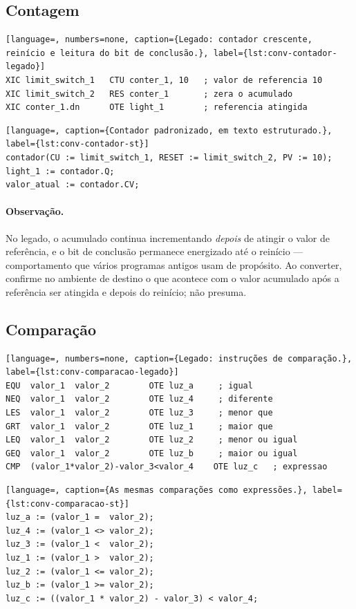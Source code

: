 \subsection{Contagem}

\begin{lstlisting}[language=, numbers=none, caption={Legado: contador crescente, reinício e leitura do bit de conclusão.}, label={lst:conv-contador-legado}]
XIC limit_switch_1   CTU conter_1, 10   ; valor de referencia 10
XIC limit_switch_2   RES conter_1       ; zera o acumulado
XIC conter_1.dn      OTE light_1        ; referencia atingida
\end{lstlisting}

\begin{lstlisting}[language=, caption={Contador padronizado, em texto estruturado.}, label={lst:conv-contador-st}]
contador(CU := limit_switch_1, RESET := limit_switch_2, PV := 10);
light_1 := contador.Q;
valor_atual := contador.CV;
\end{lstlisting}

\paragraph{Observação.} No legado, o acumulado continua incrementando \emph{depois} de atingir o valor
de referência, e o bit de conclusão permanece energizado até o reinício --- comportamento que vários
programas antigos usam de propósito. Ao converter, confirme no ambiente de destino o que acontece com
o valor acumulado após a referência ser atingida e depois do reinício; não presuma.

\subsection{Comparação}

\begin{lstlisting}[language=, numbers=none, caption={Legado: instruções de comparação.}, label={lst:conv-comparacao-legado}]
EQU  valor_1  valor_2        OTE luz_a     ; igual
NEQ  valor_1  valor_2        OTE luz_4     ; diferente
LES  valor_1  valor_2        OTE luz_3     ; menor que
GRT  valor_1  valor_2        OTE luz_1     ; maior que
LEQ  valor_1  valor_2        OTE luz_2     ; menor ou igual
GEQ  valor_1  valor_2        OTE luz_b     ; maior ou igual
CMP  (valor_1*valor_2)-valor_3<valor_4    OTE luz_c   ; expressao
\end{lstlisting}

\begin{lstlisting}[language=, caption={As mesmas comparações como expressões.}, label={lst:conv-comparacao-st}]
luz_a := (valor_1 =  valor_2);
luz_4 := (valor_1 <> valor_2);
luz_3 := (valor_1 <  valor_2);
luz_1 := (valor_1 >  valor_2);
luz_2 := (valor_1 <= valor_2);
luz_b := (valor_1 >= valor_2);
luz_c := ((valor_1 * valor_2) - valor_3) < valor_4;
\end{lstlisting}

